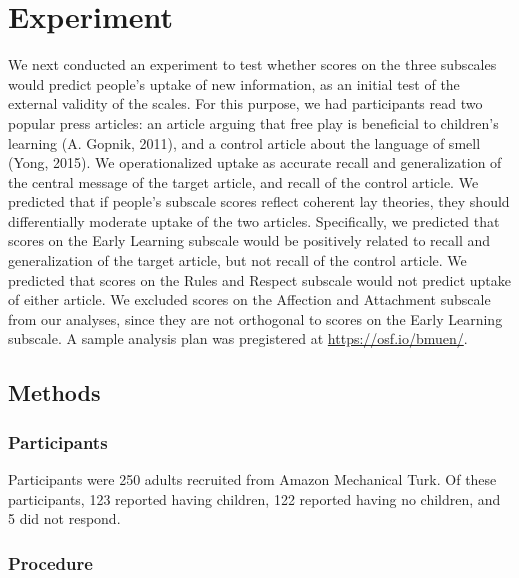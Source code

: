 \documentclass[10pt, letterpaper]{article}
\begin{document}
\section{Experiment}\label{experiment}

We next conducted an experiment to test whether scores on the three
subscales would predict people's uptake of new information, as an
initial test of the external validity of the scales. For this purpose,
we had participants read two popular press articles: an article arguing
that free play is beneficial to children's learning (A. Gopnik, 2011),
and a control article about the language of smell (Yong, 2015). We
operationalized uptake as accurate recall and generalization of the
central message of the target article, and recall of the control
article. We predicted that if people's subscale scores reflect coherent
lay theories, they should differentially moderate uptake of the two
articles. Specifically, we predicted that scores on the Early Learning
subscale would be positively related to recall and generalization of the
target article, but not recall of the control article. We predicted that
scores on the Rules and Respect subscale would not predict uptake of
either article. We excluded scores on the Affection and Attachment
subscale from our analyses, since they are not orthogonal to scores on
the Early Learning subscale. A sample analysis plan was pregistered at
\url{https://osf.io/bmuen/}.

\subsection{Methods}\label{methods}

\subsubsection{Participants}\label{participants}

Participants were 250 adults recruited from Amazon Mechanical Turk. Of
these participants, 123 reported having children, 122 reported having no
children, and 5 did not respond.

\subsubsection{Procedure}\label{procedure}
\end{document}
